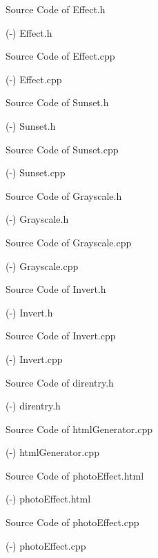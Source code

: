 \filbreak
\sec Source Code of Effect.h

\verbinput (-) Effect.h

\filbreak
\sec Source Code of Effect.cpp

\verbinput (-) Effect.cpp

\filbreak
\sec Source Code of Sunset.h

\verbinput (-) Sunset.h

\filbreak
\sec Source Code of Sunset.cpp

\verbinput (-) Sunset.cpp

\filbreak
\sec Source Code of Grayscale.h

\verbinput (-) Grayscale.h

\filbreak
\sec Source Code of Grayscale.cpp

\verbinput (-) Grayscale.cpp

\filbreak
\sec Source Code of Invert.h

\verbinput (-) Invert.h

\filbreak
\sec Source Code of Invert.cpp

\verbinput (-) Invert.cpp

\filbreak
\sec Source Code of direntry.h

\verbinput (-) direntry.h

\filbreak
\sec Source Code of htmlGenerator.cpp

\verbinput (-) htmlGenerator.cpp

\filbreak
\sec Source Code of photoEffect.html

\verbinput (-) photoEffect.html

\filbreak
\sec Source Code of photoEffect.cpp

\verbinput (-) photoEffect.cpp



\bye